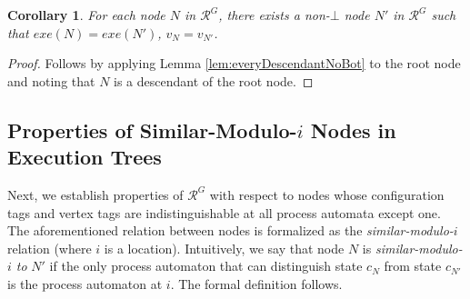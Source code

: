 \documentclass[11pt]{article}
\numberwithin{theorem}{section}
\newtheorem{corollary}[theorem]{Corollary}
\begin{document}
\begin{comment}
 On the other hand, if the action tag of the edge $E^l$ (connecting $\hat{N}$ and $\hat{N}_k$) is not $\bot$, then we apply Lemma \ref{lem:sameConfigSameChild} to fix $\widehat{N'}$ to be an $l$-child of $\widehat{N'}_k$ and $E^{\prime l}$ to be the $l$-edge connecting $\widehat{N'}_k$ and $\widehat{N'}$ such that $a_{E^l} = a_{E^{\prime l}}$, $c_{\hat{N}} = c_{\widehat{N'}}$, and $v_{\hat{N}} = v_{\widehat{N'}}$. Note that only one such edge $E^{\prime l}$ exists, and therefore, only one such $\widehat{N'}$ exists.
 By Lemma \ref{prop:nonBotChild}, $exe(\hat{N}) = exe(\hat{N}_k) \cdot a_{E^l} \cdot c_{\hat{N}}$ and $exe(\widehat{N'}) = exe(\widehat{N'}_k) \cdot a_{E^{\prime l}} \cdot c_{\widehat{N'}}$. Also recall that the suffix of $exe(\hat{N}_k)$ following $exe(N)$ is identical to the suffix of $exe(\widehat{N'}_k)$ following $exe(N')$. Therefore, the suffix of $exe(\hat{N})$ following $exe(N)$ is identical to the suffix of $exe(\widehat{N'})$ following $exe(N')$, as needed. Finally, the path from $N'$ to $\widehat{N'}$ does not contain any edge whose action tag is $\bot$, as needed.
 
 This completes the induction and the proof.
\end{proof}
\end{comment}

\begin{corollary}\label{cor:NonBotNodesExist}
For each node $N$ in $\mathcal{R}^{G}$, there exists a non-$\bot$ node $N'$ in $\mathcal{R}^{G}$ such that $exe(N) = exe(N')$, $v_N = v_{N'}$.
\end{corollary}
\begin{proof}
 Follows by applying Lemma \ref{lem:everyDescendantNoBot} to the root node and noting that $N$ is a descendant of the root node.
\end{proof}




\subsection{Properties of Similar-Modulo-$i$ Nodes in Execution Trees}\label{subsec:PropertiesOfSimilarModuloNodes}
Next, we establish properties of $\mathcal{R}^G$ with respect to nodes
whose configuration tags and vertex tags are indistinguishable at all process automata
except one. The aforementioned relation between nodes is formalized as
the \emph{similar-modulo-$i$} relation (where $i$ is a location).
Intuitively, we say that node $N$ is \emph{similar-modulo-$i$ to} $N'$ if
the only process automaton that can distinguish state $c_N$ from state
$c_{N'}$ is the process automaton at $i$. 
The formal definition follows.
\end{document}
